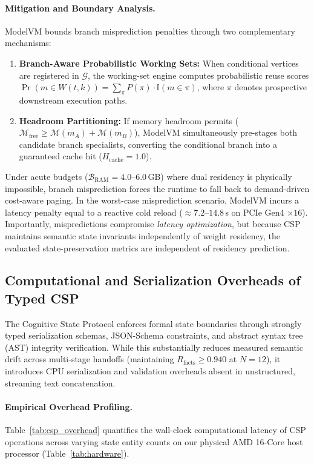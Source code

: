 \paragraph{Mitigation and Boundary Analysis.}
ModelVM bounds branch misprediction penalties through two complementary mechanisms:
\begin{enumerate}
    \item \textbf{Branch-Aware Probabilistic Working Sets:} When conditional vertices are registered in $\mathcal{G}$, the working-set engine computes probabilistic reuse scores $\Pr(m \in W(t, k)) = \sum_{\pi} P(\pi) \cdot \mathbb{I}(m \in \pi)$, where $\pi$ denotes prospective downstream execution paths.
    \item \textbf{Headroom Partitioning:} If memory headroom permits ($\mathcal{M}_{\text{free}} \ge \mathcal{M}(m_A) + \mathcal{M}(m_B)$), ModelVM simultaneously pre-stages both candidate branch specialists, converting the conditional branch into a guaranteed cache hit ($H_{\text{cache}} = 1.0$).
\end{enumerate}
Under acute budgets ($\mathcal{B}_{\text{RAM}} = 4.0\text{--}6.0$\,GB) where dual residency is physically impossible, branch misprediction forces the runtime to fall back to demand-driven cost-aware paging. In the worst-case misprediction scenario, ModelVM incurs a latency penalty equal to a reactive cold reload ($\approx 7.2\text{--}14.8$\,s on PCIe Gen4 $\times 16$). Importantly, mispredictions compromise \textit{latency optimization}, but because CSP maintains semantic state invariants independently of weight residency, the evaluated state-preservation metrics are independent of residency prediction.

\subsection{Computational and Serialization Overheads of Typed CSP}
\label{sec:lim_csp_overhead}

The Cognitive State Protocol enforces formal state boundaries through strongly typed serialization schemas, JSON-Schema constraints, and abstract syntax tree (AST) integrity verification. While this substantially reduces measured semantic drift across multi-stage handoffs (maintaining $R_{\text{facts}} \ge 0.940$ at $N=12$), it introduces CPU serialization and validation overheads absent in unstructured, streaming text concatenation.

\paragraph{Empirical Overhead Profiling.}
Table~\ref{tab:csp_overhead} quantifies the wall-clock computational latency of CSP operations across varying state entity counts on our physical AMD 16-Core host processor (Table~\ref{tab:hardware}).

